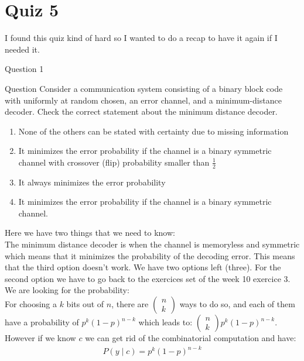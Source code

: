 \section{Quiz 5}

I found this quiz kind of hard so I wanted to do a recap to have it again if I needed it.
\begin{parag}{Question 1}
        \begin{subparag}{Question}
            Consider a communication system consisting of a binary block code with uniformly at random chosen, an error channel, and a minimum-distance decoder. Check the correct statement about the minimum distance decoder.\\
            \begin{enumerate}
                \item None of the others can be stated with certainty due to missing information
                \item It minimizes the error probability if the channel is a binary symmetric channel with crossover (flip) probability smaller than $\frac{1}{2}$
                \item It always minimizes the error probability
                \item It minimizes the error probability if the channel is a binary symmetric channel.
            \end{enumerate}
        \end{subparag}

        Here we have two things that we need to know:\\
        The minimum distance decoder is  when the channel is memoryless and symmetric which means that it minimizes the probability of the decoding error. This means that  the third option doesn't work. We have two options left  (three). For the second option we have to go back to the exercices set of the week 10 exercice 3. We are looking for the probability:\\
        For choosing a $k$ bits out of $n$, there are $\begin{pmatrix} n \\ k \end{pmatrix} $ ways to do so, and each of them have a probability of $p^k\left(1-p\right)^{n-k}$ which leads to: $\begin{pmatrix} n \\ k \end{pmatrix} p^k\left(1-p\right)^{n-k}$. However if we know $c$ we can get rid of the combinatorial computation and have:
        \begin{align*} P\left(y ∣ c\right) = p^k\left(1-p\right)^{n-k} \end{align*}


\end{parag}
